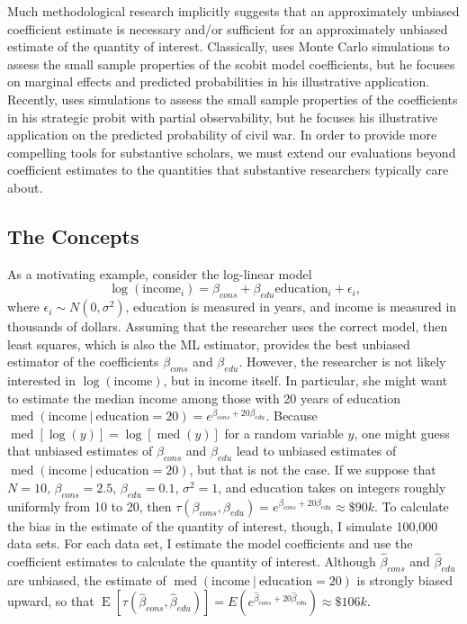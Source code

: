 \documentclass[12pt]{article}
\DeclareMathOperator{\med}{med}
\DeclareMathOperator*{\E}{\text{E}}
\begin{document}
Much methodological research implicitly suggests that an approximately unbiased coefficient estimate is necessary and/or sufficient for an approximately unbiased estimate of the quantity of interest. 
Classically, \cite{Nagler1994} uses Monte Carlo simulations to assess the small sample properties of the scobit model coefficients, but he focuses on marginal effects and predicted probabilities in his illustrative application. 
Recently, \cite{Nieman2015} uses simulations to assess the small sample properties of the coefficients in his strategic probit with partial observability, but he focuses his illustrative application on the predicted probability of civil war. 
In order to provide more compelling tools for substantive scholars, we must extend our evaluations beyond coefficient estimates to the quantities that substantive researchers typically care about.

\subsection*{The Concepts}

As a motivating example, consider the log-linear model 
\begin{equation}
\log (\text{income}_i) = \beta_{cons} + \beta_{edu} \text{education}_i + \epsilon_i \text{,}\nonumber
\end{equation}
where $\epsilon_i \sim N(0, \sigma^2)$, education is measured in years, and income is measured in thousands of dollars. 
Assuming that the researcher uses the correct model, then least squares, which is also the ML estimator, provides the best unbiased estimator of the coefficients $\beta_{cons}$ and $\beta_{edu}$. 
However, the researcher is not likely interested in $\log(\text{income})$, but in income itself. 
In particular, she might want to estimate the median income among those with 20 years of education $\med(\text{income} ~|~ \text{education} = 20) = e^{\beta_{cons} + 20\beta_{edu}}$. 
Because $\med[\log(y)] = \log[\med(y)]$ for a random variable $y$, one might guess that unbiased estimates of $\beta_{cons}$ and $\beta_{edu}$ lead to unbiased estimates of $\med(\text{income} ~|~ \text{education} = 20)$, but that is not the case. 
If we suppose that $N = 10$, $\beta_{cons} = 2.5$, $\beta_{edu} = 0.1$, $\sigma^2 = 1$, and education takes on integers roughly uniformly from 10 to 20, then $\tau(\beta_{cons}, \beta_{edu}) = e^{\beta_{cons} + 20\beta_{edu}} \approx \$90k$. 
To calculate the bias in the estimate of the quantity of interest, though, I simulate 100,000 data sets.
For each data set, I estimate the model coefficients and use the coefficient estimates to calculate the quantity of interest. 
Although $\hat{\beta}_{cons}$ and $\hat{\beta}_{edu}$ are unbiased, the estimate of $\med(\text{income} ~|~ \text{education} = 20)$ is strongly biased upward, so that $\E[\tau(\hat{\beta}_{cons}, \hat{\beta}_{edu})] = E(e^{\hat{\beta}_{cons} + 20\hat{\beta}_{edu}}) \approx \$106k$.
\end{document}
